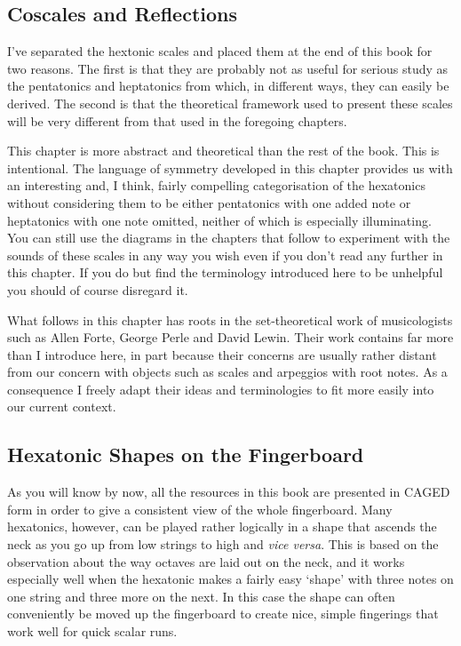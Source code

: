 \documentclass[english]{./gbook}
\begin{document}
\begin{large}
\chapter{Coscales and Reflections}

I've separated the hextonic scales and placed them at the end of this book for two reasons. The first is that they are probably not as useful for serious study as the pentatonics and heptatonics from which, in different ways, they can easily be derived. The second is that the theoretical framework used to present these scales will be very different from that used in the foregoing chapters. 

This chapter is more abstract and theoretical than the rest of the book. This is intentional. The language of symmetry developed in this chapter provides us with an interesting and, I think, fairly compelling categorisation of the hexatonics without considering them to be either pentatonics with one added note or heptatonics with one note omitted, neither of which is especially illuminating. You can still use the diagrams in the chapters that follow to experiment with the sounds of these scales in any way you wish even if you don't read any further in this chapter. If you do but find the terminology introduced here to be unhelpful you should of course disregard it.

What follows in this chapter has roots in the set-theoretical work of musicologists such as Allen Forte, George Perle and David Lewin. Their work contains far more than I introduce here, in part because their concerns are usually rather distant from our concern with objects such as scales and arpeggios with root notes. As a consequence I freely adapt their ideas and terminologies to fit more easily into our current context.

\section{Hexatonic Shapes on the Fingerboard}

As you will know by now, all the resources in this book are presented in CAGED form in order to give a consistent view of the whole fingerboard. Many hexatonics, however, can be played rather logically in a shape that ascends the neck as you go up from low strings to high and \emph{vice versa}. This is based on the observation about the way octaves are laid out on the neck, and it works especially well when the hexatonic makes a fairly easy `shape' with three notes on one string and three more on the next. In this case the shape can often conveniently be moved up the fingerboard to create nice, simple fingerings that work well for quick scalar runs.


\end{large}
\end{document}
